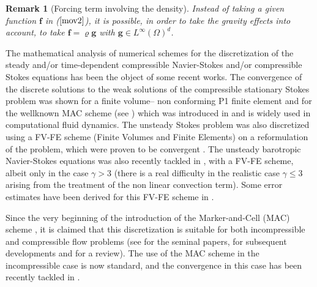\documentclass{amsart}
\newtheorem{rmq}{Remark}
\numberwithin{equation}{section}
\begin{document}
\begin{rmq}[Forcing term involving the density]
Instead of taking a given function $\bm{f}$ in ($\ref{mov2}$), it is possible, in order to take the gravity effects into account, to take $\bm{f} = {\varrho} \bm{g} $ with $ \bm{g} \in L^\infty (\Omega)^d $.
\end{rmq}

The mathematical analysis of numerical schemes for the discretization of the  steady and/or time-dependent compressible Navier-Stokes and/or compressible Stokes equations has been the object of some recent works. 
The convergence of the discrete solutions to the weak solutions of the compressible stationary Stokes problem was shown for a finite volume-- non conforming P1 finite element
\cite{gal-09-conv,eymard2010convergent,fettah2012numerical} and for the wellknown MAC scheme (see \cite{eymard2010convergence}) which was introduced in \cite{harlow1965numerical} and is widely used in computational fluid dynamics.
The unsteady Stokes problem was also discretized using a FV-FE scheme (Finite Volumes and Finite Elements) on a reformulation of the problem, which were  proven to be convergent \cite{karlsen2012convergent}.
The unsteady barotropic Navier-Stokes equations was also recently tackled in \cite{karper2013convergent}, with a FV-FE scheme, albeit only in the case $\gamma>3$ (there is a real difficulty in the realistic case $\gamma \le 3$ arising from the treatment of the non linear convection term). Some error estimates have been derived for this FV-FE scheme in \cite{Gallouet:2015ab}.

\medskip
Since the very beginning of the introduction of the Marker-and-Cell (MAC) scheme \cite{harlow1965numerical}, it is claimed that this discretization is suitable for both incompressible and compressible flow problems (see \cite{har-68-num,har-71-num} for the seminal papers, \cite{cas-84-pre,iss-85-sol,iss-86-com,kar-89-pre,bij-98-uni,col-99-pro,van-01-sta,van-03-con,vid-06-sup,wal-02-sem,wen-02-mac} for subsequent developments and \cite{wes-01-pri} for a review).
The use of the MAC scheme in the incompressible case is now standard, and the convergence in this case has been recently tackled in \cite{gallouet2015convergence}. 
\end{document}
